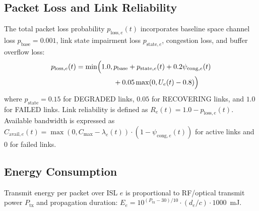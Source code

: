 \documentclass[journal]{IEEEtran}
\begin{document}
\subsection{Packet Loss and Link Reliability}
The total packet loss probability $p_{\text{loss},e}(t)$ incorporates baseline space channel loss $p_{\text{base}} = 0.001$, link state impairment loss $p_{\text{state},e}$, congestion loss, and buffer overflow loss:
\begin{equation}
\begin{split}
p_{\text{loss},e}(t) = \min\Bigl( 1.0, \, & p_{\text{base}} + p_{\text{state},e}(t) + 0.2 \psi_{\text{cong},e}(t) \\
& + 0.05 \max(0, U_e(t) - 0.8) \Bigr)
\end{split}
\label{eq:loss}
\end{equation}
where $p_{\text{state}} = 0.15$ for DEGRADED links, $0.05$ for RECOVERING links, and $1.0$ for FAILED links. Link reliability is defined as $R_e(t) = 1.0 - p_{\text{loss},e}(t)$. Available bandwidth is expressed as $C_{\text{avail},e}(t) = \max(0, C_{\max} - \lambda_e(t)) \cdot (1 - \psi_{\text{cong},e}(t))$ for active links and 0 for failed links.

\subsection{Energy Consumption}
Transmit energy per packet over ISL $e$ is proportional to RF/optical transmit power $P_{\text{tx}}$ and propagation duration: $E_e = 10^{(P_{\text{tx}} - 30)/10} \cdot (d_e / c) \cdot 1000$~mJ.
\end{document}
